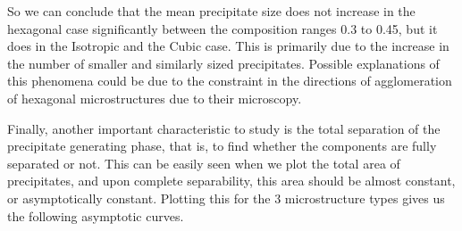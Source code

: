 \documentclass[12pt, a4paper]{report}
\begin{document}

So we can conclude that the mean precipitate size does not increase in the hexagonal case significantly between the composition ranges 0.3 to 0.45, but it does in the Isotropic and the Cubic case. This is primarily due to the increase in the number of smaller and similarly sized precipitates. Possible explanations of this phenomena could be due to the constraint in the directions of agglomeration of hexagonal microstructures due to their microscopy.

Finally, another important characteristic to study is the total separation of the precipitate generating phase, that is, to find whether the components are fully separated or not. This can be easily seen when we plot the total area of precipitates, and upon complete separability, this area should be almost constant, or asymptotically constant. Plotting this for the 3 microstructure types gives us the following asymptotic curves.
\end{document}
